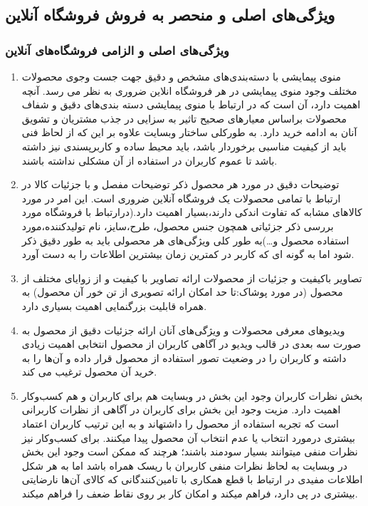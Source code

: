 \documentclass[14pt]{article}
\begin{document}
\begin{flushright}
\begin{itemize}
\subsection{ویژگی‌های اصلی و منحصر به فروش فروشگاه آنلاین}

\subsubsection{ویژگی‌های اصلی و الزامی فروشگاه‌های آنلاین}


\end{itemize}

\begin{enumerate}

\item منوی پیمایشی با دسته‌بندی‌های مشخص و دقیق جهت جست وجوی محصولات مختلف
\newline
وجود منوی پیمایشی در هر فروشگاه انلاین ضروری به نظر می رسد. آنچه اهمیت دارد، آن است که در ارتباط با منوی پیمایشی دسته بندی‌های دقیق و شفاف محصولات براساس معیارهای صحیح تاثیر به سزایی در جذب مشتریان و تشویق آنان به ادامه خرید دارد. به طورکلی ساختار وبسایت علاوه بر این که از لحاظ فنی باید از کیفیت مناسبی برخوردار باشد، باید محیط ساده و کاربرپسندی نیز داشته باشد تا عموم کاربران در استفاده از آن مشکلی نداشته باشند. 
\item توضیحات دقیق در مورد هر محصول
\newline
ذکر توضیحات مفصل و با جزئیات کالا در ارتباط با تمامی محصولات یک فروشگاه آنلاین ضروری است. این امر در مورد کالاهای مشابه که تفاوت اندکی دارند،‌بسیار اهمیت دارد.(درارتباط با فروشگاه مورد بررسی ذکر جزئیاتی همچون جنس محصول، طرح،سایز، نام تولیدکننده،مورد استفاده محصول و…)به طور کلی ویژگی‌های هر محصولی باید به طور دقیق ذکر شود اما به گونه ای که کاربر در کمترین زمان بیشترین اطلاعات را به دست آورد.
\item تصاویر باکیفیت و جزئیات از محصولات
\newline
ارائه تصاویر با کیفیت و از زوایای مختلف از محصول (در مورد پوشاک:تا حد امکان ارائه تصویری از تن خور آن محصول) به همراه قابلیت بزرگنمایی اهمیت بسیاری دارد.
\item ویدیوهای معرفی محصولات و ویژگی‌های آنان
\newline
ارائه جزئیات دقیق از محصول به صورت سه بعدی در قالب ویدیو در آگاهی کاربران از محصول انتخابی اهمیت زیادی داشته و کاربران را در وضعیت تصور استفاده از محصول قرار داده و آن‌ها را به خرید آن محصول ترغیب می کند.
\item بخش نظرات کاربران
\newline
وجود این بخش در وبسایت هم برای کاربران و هم کسب‌وکار اهمیت دارد. مزیت وجود این بخش برای کاربران در آگاهی از نظرات کاربرانی است که تجربه استفاده از محصول را داشتهاند و به این ترتیب کاربران اعتماد بیشتری درمورد انتخاب یا عدم انتخاب آن محصول پیدا میکنند. برای کسب‌وکار نیز نظرات منفی میتوانند بسیار سودمند باشند؛‌ هرچند که ممکن است وجود این بخش در وبسایت به لحاظ نظرات منفی کاربران با ریسک همراه باشد اما به هر شکل اطلاعات مفیدی در ارتباط با قطع همکاری با تامین‌کنندگانی که کالای آن‌ها نارضایتی بیشتری در پی دارد، فراهم میکند و امکان کار بر روی نقاط ضعف را فراهم میکند.

\end{enumerate}
\end{flushright}
\end{document}
